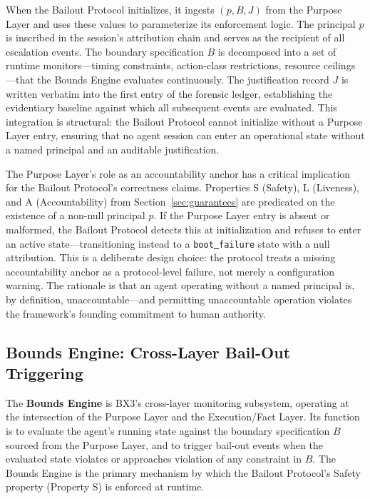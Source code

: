 When the Bailout Protocol initializes, it ingests $(p, B, J)$ from the Purpose Layer and uses these values to parameterize its enforcement logic. The principal $p$ is inscribed in the session's attribution chain and serves as the recipient of all escalation events. The boundary specification $B$ is decomposed into a set of runtime monitors—timing constraints, action-class restrictions, resource ceilings—that the Bounds Engine evaluates continuously. The justification record $J$ is written verbatim into the first entry of the forensic ledger, establishing the evidentiary baseline against which all subsequent events are evaluated. This integration is structural: the Bailout Protocol cannot initialize without a Purpose Layer entry, ensuring that no agent session can enter an operational state without a named principal and an auditable justification.

The Purpose Layer's role as an accountability anchor has a critical implication for the Bailout Protocol's correctness claims. Properties S (Safety), L (Liveness), and A (Accountability) from Section~\ref{sec:guarantees} are predicated on the existence of a non-null principal $p$. If the Purpose Layer entry is absent or malformed, the Bailout Protocol detects this at initialization and refuses to enter an active state—transitioning instead to a \texttt{boot\underline{ }failure} state with a null attribution. This is a deliberate design choice: the protocol treats a missing accountability anchor as a protocol-level failure, not merely a configuration warning. The rationale is that an agent operating without a named principal is, by definition, unaccountable—and permitting unaccountable operation violates the framework's founding commitment to human authority.

\subsection{Bounds Engine: Cross-Layer Bail-Out Triggering}

The \textbf{Bounds Engine} is BX3's cross-layer monitoring subsystem, operating at the intersection of the Purpose Layer and the Execution/Fact Layer. Its function is to evaluate the agent's running state against the boundary specification $B$ sourced from the Purpose Layer, and to trigger bail-out events when the evaluated state violates or approaches violation of any constraint in $B$. The Bounds Engine is the primary mechanism by which the Bailout Protocol's Safety property (Property S) is enforced at runtime.

